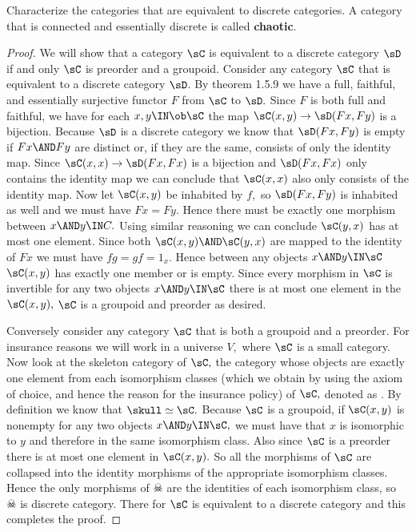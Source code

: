 \documentclass[main.tex]{subfiles}
\begin{document}
\begin{exercise}
	Characterize the categories that are equivalent to
	discrete categories. A category that is connected and essentially
	discrete is called \textbf{chaotic}.
\end{exercise}
\begin{proof}
	We will show that a category $ \sC $ is equivalent to a discrete category $ \sD $ if and only $ \sC $ is preorder and a groupoid.
	Consider any category $ \sC $ that is equivalent to a discrete category
	$ \sD $. By theorem 1.5.9 we have a full, faithful, and essentially
	surjective functor $ F $ from $ \sC $ to $\sD. $ Since $ F $ is both
	full and
	faithful, we have for each $ x,y\IN\ob\sC $ the map $
	\sC(x,y)\to\sD(Fx,Fy) $ is a bijection. Because $ \sD $ is a discrete
	category we know that $ \sD(Fx,Fy) $ is empty if $ Fx\AND Fy $
	are distinct or, if they are the same, consists of only the identity
	map. Since $ \sC(x,x)\to \sD(Fx,Fx) $ is a bijection and $ \sD(Fx,Fx) $
	only contains the identity map we can conclude that $ \sC(x,x) $ also
	only consists of the identity map. Now let $\sC(x,y)$ be inhabited by $
	f, $ so $ \sD(Fx,Fy) $ is inhabited as well and we must have $ Fx=Fy.$
	Hence there must be exactly one morphism between $ x\AND y\IN C. $
	Using similar reasoning we can conclude $ \sC(y,x) $ has at most one
	element. Since both $ \sC(x,y) \AND \sC(y,x)$ are mapped to the
	identity of $ Fx $ we must have $fg=gf=1_x .$ Hence between any objects
	$ x\AND y\IN\sC $ $ \sC(x,y) $ has exactly one member or is empty. Since
	every morphism in $ \sC $ is invertible for any two objects $ x\AND
	y\IN\sC $ there is at most one element in the $ \sC(x,y),$ $ \sC $ is
	a groupoid and preorder as desired.

	Conversely consider any category $ \sC $ that is both a groupoid and a
	preorder. For insurance reasons we will work in a universe $ V, $
	where $ \sC $ is a small category.
	Now look at the skeleton category of $\sC, $ the category whose
	objects are exactly one element from each isomorphism classes (which we obtain by using the axiom of choice, and hence the reason for the insurance policy) of $ \sC,$ denoted
	as  \skull. By definition we know that $ \skull\simeq \sC.$ Because
	$ \sC $ is a groupoid, if $ \sC(x,y) $ is nonempty for any two objects
	$ x\AND y\IN\sC,$ we must have that $ x $ is isomorphic to $ y$ and
	therefore in the same isomorphism class. Also since $ \sC $ is a
	preorder there is at most one element in $ \sC(x,y).$ So all the
	morphisms of $ \sC $ are collapsed into the identity morphisms of the
	appropriate isomorphism classes. Hence the only morphisms of $ \skull $
	are the identities of each isomorphism class, so $ \skull $ is discrete
	category. There for $ \sC $ is equivalent to a discrete category and
	this completes the proof.
\end{proof}
\end{document}
